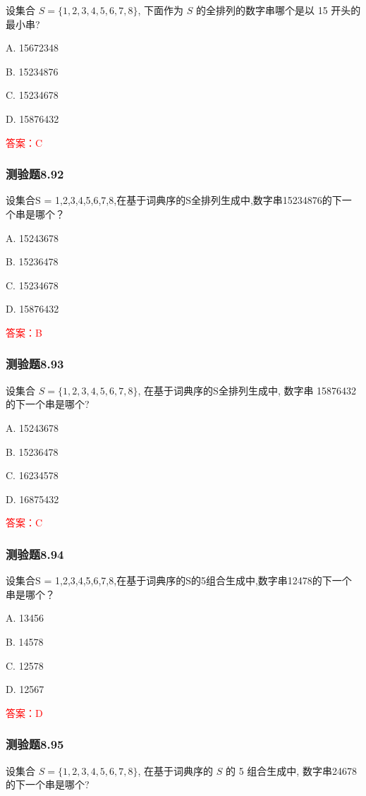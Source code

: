 \documentclass[UTF8, heading=true]{ctexart}
\begin{document}
设集合 $S=\{1,2,3,4,5,6,7,8\}$, 下面作为 $S$ 的全排列的数字串哪个是以 15 开头的最小串?

A. 15672348

B. 15234876

C. 15234678

D. 15876432

\textcolor{red}{答案：C}

\subsubsection{测验题8.92}

设集合S = {1,2,3,4,5,6,7,8},在基于词典序的S全排列生成中,数字串15234876的下一个串是哪个？

A. 15243678

B. 15236478

C. 15234678

D. 15876432

\textcolor{red}{答案：B}

\subsubsection{测验题8.93}

设集合 $S=\{1,2,3,4,5,6,7,8\}$, 在基于词典序的S全排列生成中, 数字串 15876432 的下一个串是哪个?

A. 15243678

B. 15236478

C. 16234578

D. 16875432

\textcolor{red}{答案：C}

\subsubsection{测验题8.94}
设集合S = {1,2,3,4,5,6,7,8},在基于词典序的S的5组合生成中,数字串12478的下一个串是哪个？

A. 13456

B. 14578

C. 12578

D. 12567

\textcolor{red}{答案：D}


\subsubsection{测验题8.95}

设集合 $S=\{1,2,3,4,5,6,7,8\}$, 在基于词典序的 $S$ 的 5 组合生成中, 数字串24678的下一个串是哪个?
\end{document}
